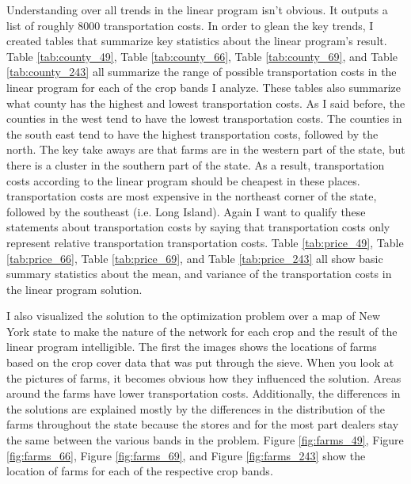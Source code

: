 \documentclass{report}
\begin{document}
Understanding over all trends in the linear program isn't obvious. It outputs a list of roughly 8000 transportation costs. In order to glean the key trends, I created tables that summarize key statistics about the linear program's result. Table \ref{tab:county_49}, Table \ref{tab:county_66}, Table \ref{tab:county_69}, and Table \ref{tab:county_243} all summarize the range of possible transportation costs in the linear program for each of the crop bands I analyze. These tables also summarize what county has the highest and lowest transportation costs. As I said before, the counties in the west tend to have the lowest transportation costs. The counties in the south east tend to have the highest transportation costs, followed by the north. The key take aways are that farms are in the western part of the state, but there is a cluster in the southern part of the state. As a result, transportation costs according to the linear program should be cheapest in these places. transportation costs are most expensive in the northeast corner of the state, followed by the southeast (i.e. Long Island). Again I want to qualify these statements about transportation costs by saying that transportation costs only represent relative transportation transportation costs. Table  \ref{tab:price_49}, Table  \ref{tab:price_66}, Table  \ref{tab:price_69}, and Table  \ref{tab:price_243} all show basic summary statistics about the mean, and variance of the transportation costs in the linear program solution.

I also visualized the solution to the optimization problem over a map of New York state to make the nature of the network for each crop and the result of the linear program intelligible. The first the images shows the locations of farms based on the crop cover data that was put through the sieve. When you look at the pictures of farms, it becomes obvious how they influenced the solution. Areas around the farms have lower transportation costs. Additionally, the differences in the solutions are explained mostly by the differences in the distribution of the farms throughout the state because  the stores and for the most part dealers stay the same between the various bands in the problem. Figure \ref{fig:farms_49}, Figure \ref{fig:farms_66}, Figure \ref{fig:farms_69}, and Figure \ref{fig:farms_243} show the location of farms for each of the respective crop bands.
\end{document}
